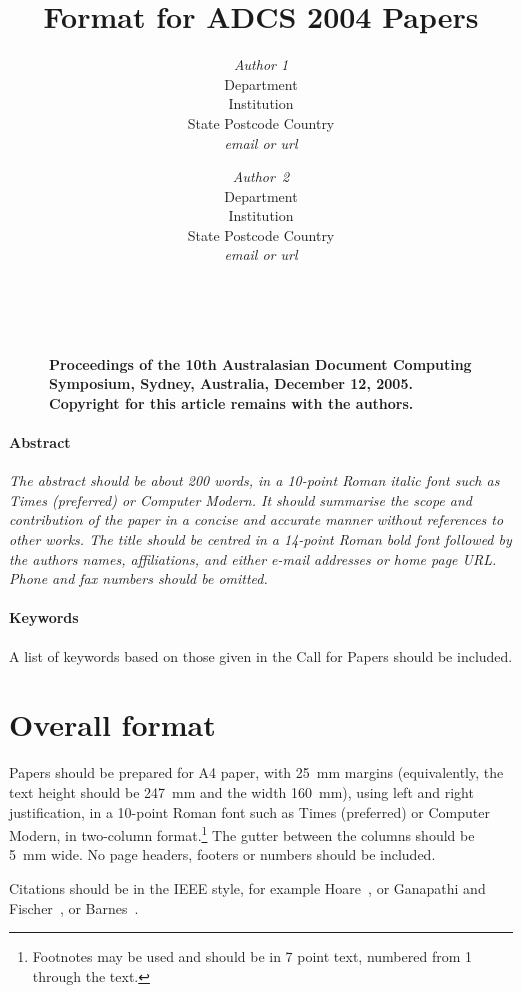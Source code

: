 \documentclass[twocolumn]{article}
\title{Format for ADCS 2004 Papers}
\author{{\em Author 1}\\[1ex]
        Department\\Institution\\State Postcode Country\\[1ex]
        {\em email or url} \and
        {\em Author~2}\\[1ex]
        Department\\Institution\\State Postcode Country\\[1ex]
        {\em email or url}}
\date{}
\begin{document}
\maketitle
\thispagestyle{empty}


        \begin{figure}[b]
	~\\
        \noindent
        {\small\raggedright\bf
        Proceedings of the 10th Australasian 
	Document Computing Symposium,
	Sydney, Australia,
        December 12, 2005.
	Copyright for this article remains with the authors.
        }
        \end{figure}


\paragraph*{Abstract}
\noindent
{\it 
The abstract should be about 200 words, in a 10-point Roman italic
font such as Times (preferred) or Computer Modern.
It should summarise the scope and contribution of the paper in a
concise and accurate manner without references to other works.
The title should be centred in a 14-point Roman bold font followed by
the authors names, affiliations, and either e-mail addresses or home
page URL.
Phone and fax numbers should be omitted.
} 

\paragraph*{Keywords} 
A list of keywords based on those given in the Call for Papers should be included.


\section{Overall format}

Papers should be prepared for A4 paper, with 25~mm margins
(equivalently, the text height should be 247~mm and the width
160~mm), using left and right justification, in a 10-point Roman font
such as Times (preferred) or Computer Modern, in two-column
format.\footnote{Footnotes may be used and should be in 7 point text,
numbered from 1 through the text.}
The gutter between the columns should be 5~mm wide.
No page headers, footers or numbers should be included.

Citations should be in the IEEE style, for example
Hoare~\cite{Hoare73}, or Ganapathi and
Fischer~\cite{GanapathiFischer82}, or 
Barnes~\cite{Barnes80,Barnes89}.
\end{document}
